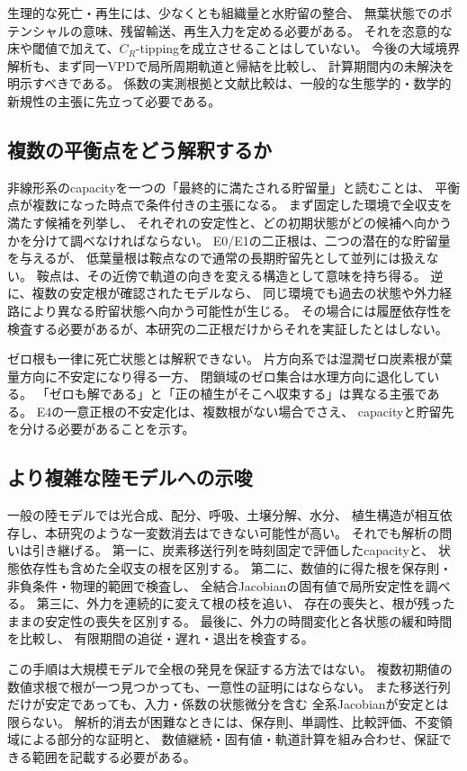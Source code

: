 \documentclass[a4paper,11pt]{ltjsarticle}
\begin{document}
生理的な死亡・再生には、少なくとも組織量と水貯留の整合、
無葉状態でのポテンシャルの意味、残留輸送、再生入力を定める必要がある。
それを恣意的な床や閾値で加えて、$C_R$-tippingを成立させることはしていない。
今後の大域境界解析も、まず同一VPDで局所周期軌道と帰結を比較し、
計算期間内の未解決を明示すべきである。
係数の実測根拠と文献比較は、一般的な生態学的・数学的新規性の主張に先立って必要である。

\subsection{複数の平衡点をどう解釈するか}
非線形系のcapacityを一つの「最終的に満たされる貯留量」と読むことは、
平衡点が複数になった時点で条件付きの主張になる。
まず固定した環境で全収支を満たす候補を列挙し、
それぞれの安定性と、どの初期状態がどの候補へ向かうかを分けて調べなければならない。
E0/E1の二正根は、二つの潜在的な貯留量を与えるが、
低葉量根は鞍点なので通常の長期貯留先として並列には扱えない。
鞍点は、その近傍で軌道の向きを変える構造として意味を持ち得る。
逆に、複数の安定根が確認されたモデルなら、
同じ環境でも過去の状態や外力経路により異なる貯留状態へ向かう可能性が生じる。
その場合には履歴依存性を検査する必要があるが、本研究の二正根だけからそれを実証したとはしない。

ゼロ根も一律に死亡状態とは解釈できない。
片方向系では湿潤ゼロ炭素根が葉量方向に不安定になり得る一方、
閉鎖域のゼロ集合は水理方向に退化している。
「ゼロも解である」と「正の植生がそこへ収束する」は異なる主張である。
E4の一意正根の不安定化は、複数根がない場合でさえ、
capacityと貯留先を分ける必要があることを示す。

\subsection{より複雑な陸モデルへの示唆}
一般の陸モデルでは光合成、配分、呼吸、土壌分解、水分、
植生構造が相互依存し、本研究のような一変数消去はできない可能性が高い。
それでも解析の問いは引き継げる。
第一に、炭素移送行列を時刻固定で評価したcapacityと、
状態依存性も含めた全収支の根を区別する。
第二に、数値的に得た根を保存則・非負条件・物理的範囲で検査し、
全結合Jacobianの固有値で局所安定性を調べる。
第三に、外力を連続的に変えて根の枝を追い、
存在の喪失と、根が残ったままの安定性の喪失を区別する。
最後に、外力の時間変化と各状態の緩和時間を比較し、
有限期間の追従・遅れ・退出を検査する。

この手順は大規模モデルで全根の発見を保証する方法ではない。
複数初期値の数値求根で根が一つ見つかっても、一意性の証明にはならない。
また移送行列だけが安定であっても、入力・係数の状態微分を含む
全系Jacobianが安定とは限らない。
解析的消去が困難なときには、保存則、単調性、比較評価、不変領域による部分的な証明と、
数値継続・固有値・軌道計算を組み合わせ、保証できる範囲を記載する必要がある。
\end{document}
